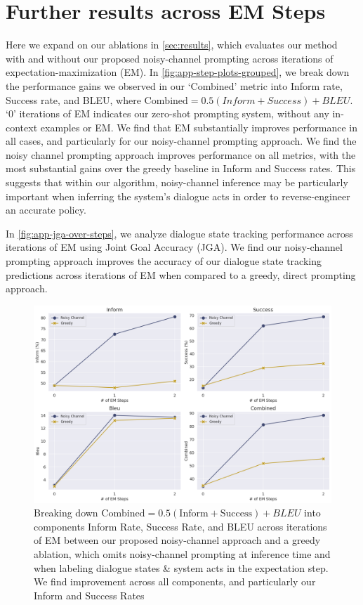 \documentclass[11pt]{article}
\begin{document}
\section{Further results across EM Steps}
\label{app:additional-ablations}

Here we expand on our ablations in \autoref{sec:results}, which evaluates our method with and without our proposed noisy-channel prompting across iterations of expectation-maximization (EM). In \autoref{fig:app-step-plots-grouped}, we break down the performance gains we observed in our `Combined' metric into Inform rate, Success rate, and BLEU, where $\text{Combined} = 0.5(Inform + Success) + BLEU$. `0' iterations of EM indicates our zero-shot prompting system, without any in-context examples or EM. We find that EM substantially improves performance in all cases, and particularly for our noisy-channel prompting approach. We find the noisy channel prompting approach improves performance on all metrics, with the most substantial gains over the greedy baseline in Inform and Success rates. 
This suggests that within our algorithm, noisy-channel inference may be particularly important when inferring the system's dialogue acts in order to reverse-engineer an accurate policy.

In \autoref{fig:app-jga-over-steps}, we analyze dialogue state tracking performance across iterations of EM using Joint Goal Accuracy (JGA). We find our noisy-channel prompting approach improves the accuracy of our dialogue state tracking predictions across iterations of EM when compared to a greedy, direct prompting approach.

\begin{figure}
    \includegraphics[width=\textwidth]{imgs/step_plots_v2/inform_success_bleu_combined_multi_plot.png}
    \caption{Breaking down $\text{Combined} = 0.5(\text{Inform} + \text{Success}) + BLEU$ into components Inform Rate, Success Rate, and BLEU across iterations of EM between our proposed noisy-channel approach and a greedy ablation, which omits noisy-channel prompting at inference time and when labeling dialogue states \& system acts in the expectation step. We find improvement across all components, and particularly our Inform and Success Rates}
    \label{fig:app-step-plots-grouped}
\end{figure}
\end{document}
